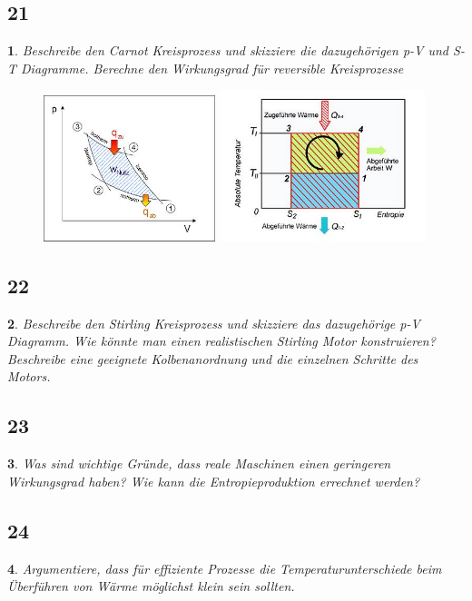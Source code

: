 \documentclass[12pt,a4paper]{report}
\newtheorem{myfrag}{}%
\begin{document}
\subsection{21}
\begin{myfrag}
Beschreibe den Carnot Kreisprozess und skizziere die dazugehörigen p-V und S-T
Diagramme. Berechne den Wirkungsgrad für reversible Kreisprozesse
\end{myfrag}
\begin{figure}[H]
\includegraphics[width=5cm]{Bilder/Frage21pV.jpg} 
\includegraphics[width=6cm]{Bilder/Frage21TS.jpg} 
\end{figure}
\subsection{22}
\begin{myfrag}
Beschreibe den Stirling Kreisprozess und skizziere das dazugehörige p-V
Diagramm. Wie könnte man einen realistischen Stirling Motor konstruieren?
Beschreibe eine geeignete Kolbenanordnung und die einzelnen Schritte des
Motors.
\end{myfrag}
\subsection{23}
\begin{myfrag}
Was sind wichtige Gründe, dass reale Maschinen einen geringeren Wirkungsgrad
haben? Wie kann die Entropieproduktion errechnet werden?
\end{myfrag}
\subsection{24}
\begin{myfrag}
Argumentiere, dass für effiziente Prozesse die Temperaturunterschiede beim
Überführen von Wärme möglichst klein sein sollten.
\end{myfrag}
\end{document}
